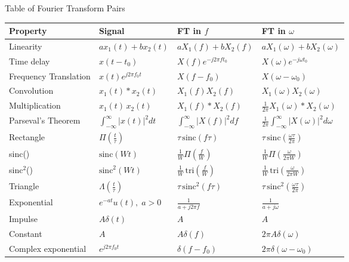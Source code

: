 \documentclass[a4paper,10.5pt]{article}
\begin{document}
Table of Fourier Transform Pairs

\small

\begin{center}
\renewcommand{\arraystretch}{1.5}
\begin{tabular}{|>{\centering\arraybackslash}m{3cm}|
                >{\centering\arraybackslash}m{3cm}|
                >{\centering\arraybackslash}m{4cm}|
                >{\centering\arraybackslash}m{4cm}|}

\hline
\textbf{Property} & \textbf{Signal} & \textbf{FT in $f$} & \textbf{FT in $\omega$} \\

\hline
Linearity & $a x_1(t) + b x_2(t)$ & $a X_1(f) + b X_2(f)$ & $a X_1(\omega) + b X_2(\omega)$ \\
\hline
Time delay & $x(t-t_0)$ & $X(f)e^{-j 2\pi f t_0}$ & $X(\omega)e^{-j \omega t_0}$ \\
\hline
Frequency Translation & $x(t)e^{j 2\pi f_0 t}$ & $X(f-f_0)$ & $X(\omega-\omega_0)$ \\
\hline
Convolution & $x_1(t) * x_2(t)$ & $X_1(f) X_2(f)$ & $X_1(\omega) X_2(\omega)$ \\
\hline
Multiplication & $x_1(t)\,x_2(t)$ & $X_1(f) * X_2(f)$ & $\tfrac{1}{2\pi} X_1(\omega) * X_2(\omega)$ \\
\hline
Parseval's Theorem & $\int_{-\infty}^\infty |x(t)|^2 dt$ & $\int_{-\infty}^\infty |X(f)|^2 df$ & $\tfrac{1}{2\pi}\int_{-\infty}^\infty |X(\omega)|^2 d\omega$ \\
\hline

	Rectangle &
	$\Pi\!\left(\tfrac{t}{\tau}\right)$ &
	$\tau \,\mathrm{sinc}(f\tau)$ &
	$\tau \,\mathrm{sinc}\!\left(\tfrac{\omega \tau}{2\pi}\right)$
	\\

\hline

	sinc() &
        $ \mathrm{sinc}(Wt)$ & 
        $ \tfrac{1}{W} \Pi\!\left(\tfrac{f}{W}\right)$ & 
        $ \tfrac{1}{W} \Pi\!\left(\tfrac{\omega}{2\pi W}\right)$ 
        \\

\hline

                sinc$^2$() & 
                $ \mathrm{sinc}^2(Wt)$ & 
                $ \tfrac{1}{W}\,\mathrm{tri}\!\left(\tfrac{f}{W}\right)$ & 
                $ \tfrac{1}{W}\,\mathrm{tri}\!\left(\tfrac{\omega}{2\pi W}\right)$ 
                \\

\hline
Triangle & $\Lambda\!\left(\tfrac{t}{\tau}\right)$ & $\tau\,\mathrm{sinc}^2(f\tau)$ & $\tau\,\mathrm{sinc}^2\!\left(\tfrac{\omega \tau}{2\pi}\right)$ \\
\hline
Exponential & $e^{-at}u(t),\; a>0$ & $\tfrac{1}{a + j 2\pi f}$ & $\tfrac{1}{a + j \omega}$ \\
\hline
Impulse & $A \delta(t)$ & $A$ & $A$ \\
\hline
Constant & $A$ & $A \delta(f)$ & $2\pi A \delta(\omega)$ \\
\hline
Complex exponential & $e^{j 2\pi f_0 t}$ & $\delta(f-f_0)$ & $2\pi \delta(\omega-\omega_0)$ \\
\hline
\end{tabular}
\end{center}
\end{document}
